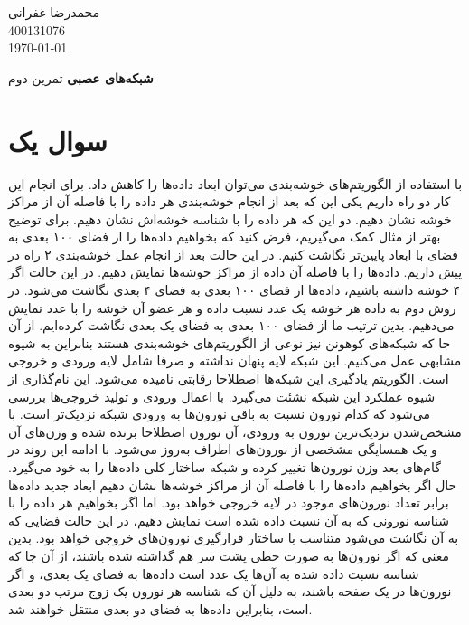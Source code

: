 \documentclass[12pt, a4paper]{article}
\newcommand{\coursetitle}{شبکه‌های عصبی}
\newcommand{\doctitle}{تمرین دوم}
\newcommand{\name}{محمدرضا غفرانی}
\newcommand{\studentno}{400131076}
\newcommand{\todaydate}{\today}
\begin{document}
\begin{flushleft}
    \name \\
    \studentno \\
    \todaydate
\end{flushleft}

\begin{center}
    \huge
    \textbf{\coursetitle}
    \break
    \large
    \doctitle
\end{center}

\thispagestyle{plain}

\section*{سوال یک}

با استفاده از الگوریتم‌های خوشه‌بندی می‌توان ابعاد داده‌ها را کاهش داد. برای انجام این کار دو راه داریم یکی این که
بعد از انجام خوشه‌بندی هر داده را با فاصله آن از مراکز خوشه نشان دهیم. دو این که
هر داده را با شناسه خوشه‌اش نشان دهیم. برای توضیح بهتر از مثال کمک می‌گیریم، فرض کنید که بخواهیم داده‌ها را از
فضای ۱۰۰ بعدی به فضای با ابعاد پایین‌تر نگاشت کنیم. در این حالت بعد از انجام عمل خوشه‌بندی
۲ راه در پیش داریم. داده‌ها را با فاصله آن داده از مراکز خوشه‌ها نمایش دهیم. در این حالت اگر ۴ خوشه داشته باشیم،
داده‌ها از فضای ۱۰۰ بعدی به فضای ۴ بعدی نگاشت می‌شود. در روش دوم به داده هر خوشه یک عدد نسبت داده و هر عضو آن خوشه را با
عدد نمایش می‌دهیم. بدین ترتیب ما از فضای ۱۰۰ بعدی به فضای یک بعدی نگاشت کرده‌ایم.
از آن جا که شبکه‌های کوهونن نیز نوعی از الگوریتم‌های خوشه‌بندی هستند بنابراین به شیوه مشابهی عمل می‌کنیم.
این شبکه‌ لایه پنهان نداشته و صرفا شامل لایه ورودی و خروجی است.
الگوریتم یادگیری این شبکه‌ها اصطلاحا رقابتی نامیده می‌‌شود. این نام‌گذاری از شیوه عملکرد این شبکه نشئت می‌گیرد.
با اعمال ورودی و تولید خروجی‌ها بررسی می‌شود که کدام نورون نسبت به باقی نورون‌ها به ورودی شبکه
نزدیک‌تر است. با مشخص‌شدن نزدیک‌ترین نورون به ورودی، آن نورون اصطلاحا برنده شده و وزن‌های آن و
یک همسایگی مشخصی از نورون‌های اطراف به‌روز می‌شود. با ادامه این روند در گام‌های بعد وزن‌ نورون‌ها تغییر کرده و
شبکه ساختار کلی داده‌ها را به خود می‌گیرد. حال اگر بخواهیم داده‌ها را با فاصله آن از مراکز خوشه‌ها نشان دهیم
ابعاد جدید داده‌ها برابر تعداد نورون‌های موجود در لایه خروجی خواهد بود. اما اگر بخواهیم هر داده را با شناسه
نورونی که به آن نسبت داده شده است نمایش دهیم، در این حالت فضایی که به آن نگاشت می‌شود متناسب با ساختار
قرارگیری نورون‌های خروجی خواهد بود. بدین معنی که اگر نورون‌ها به صورت خطی پشت سر هم گذاشته شده باشند،
از آن جا که شناسه نسبت داده شده به آن‌ها یک عدد است داده‌ها به فضای یک بعدی، و اگر نورون‌ها در یک صفحه باشند،
به دلیل آن که شناسه هر نورون یک زوج مرتب دو بعدی است، بنابراین داده‌ها به فضای دو بعدی منتقل خواهند شد.
\end{document}
